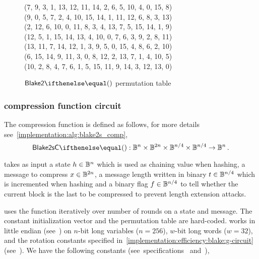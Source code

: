 \begin{figure*}
\begin{minipage}[t]{.6\textwidth}
{       \gets (7, 9, 3, 1, 13, 12, 11, 14, 2, 6, 5, 10, 4, 0, 15, 8) \\
       \gets (9, 0, 5, 7, 2, 4, 10, 15, 14, 1, 11, 12, 6, 8, 3, 13) \\
       \gets (2, 12, 6, 10, 0, 11, 8, 3, 4, 13, 7, 5, 15, 14, 1, 9) \\
       \gets (12, 5, 1, 15, 14, 13, 4, 10, 0, 7, 6, 3, 9, 2, 8, 11) \\
       \gets (13, 11, 7, 14, 12, 1, 3, 9, 5, 0, 15, 4, 8, 6, 2, 10) \\
       \gets (6, 15, 14, 9, 11, 3, 0, 8, 12, 2, 13, 7, 1, 4, 10, 5) \\
       \gets (10, 2, 8, 4, 7, 6, 1, 5, 15, 11, 9, 14, 3, 12, 13, 0) \\
      \pcreturn \blakePermutation{}
    }
    \caption{$\blake{2}{}$ permutation table~\cite[Section 2.7]{blakecompietf}}\label{implementation:alg:blake2-perm}
  \end{minipage}
\end{figure*}

\subsubsection{ compression function circuit}\label{implementation:efficiency:blake:comp-circuit}

The compression function is defined as follows, for more details see~\cref{implementation:alg:blake2s_comp},
\[
  \blake{2sC}{} : \BB^n \times \BB^{2n} \times \BB^{n/4} \times \BB^{n/4} \to \BB^n\,.
\]

 takes as input a state $h \in \mathbb{B}^n$ which is used as chaining value when hashing, a message to compress $x \in \mathbb{B}^{2n}$, a message length written in binary $t \in \mathbb{B}^{n/4}$ which is incremented when hashing and a binary flag $f \in \mathbb{B}^{n/4}$ to tell whether the current block is the last to be compressed to prevent length extension attacks.

 uses the \blakeG function iteratively over \blakeRound number of rounds on a state and message. The constant initialization vector \blakeIV{} and the permutation table \blakePermutation{} are hard-coded.  works in little endian (see~\cite[Section 2.4]{blakecompietf}) on $n$-bit long variables ($n = 256$), $w$-bit long words ($w = 32$), and the rotation constants specified in~\cref{implementation:efficiency:blake:g-circuit} (see~\cite[Section 2.1]{blakecompietf}). We have the following constants (see~specifications~\cite{aumasson2013blake2} and~\cite[Section 2.2]{blakecompietf}),

